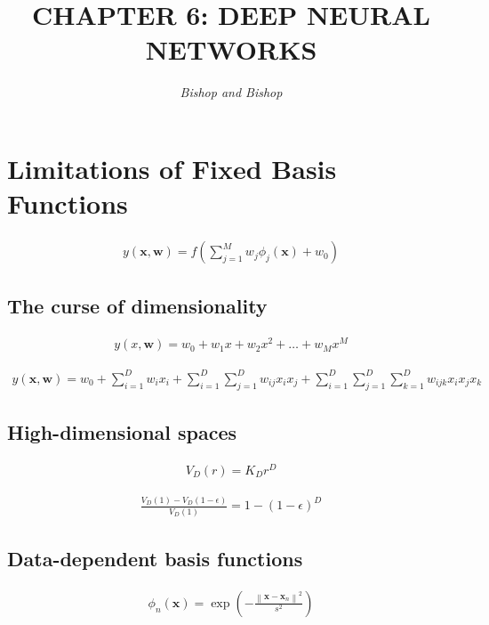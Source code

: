 \documentclass{article}
\title{\LARGE\scshape\MakeUppercase{Chapter 6: Deep Neural Networks}}
\author{\textit{Bishop and Bishop}}
\date{}  %
\begin{document}
\maketitle

\section{Limitations of Fixed Basis Functions}

\begin{align*}
y(\mathbf{x}, \mathbf{w})=f\left(\sum_{j=1}^{M} w_{j} \phi_{j}(\mathbf{x})+w_{0}\right) 
\tag{6.1}
\end{align*}

\subsection{The curse of dimensionality}

\begin{align*}
y(x, \mathbf{w})=w_{0}+w_{1} x+w_{2} x^{2}+\ldots+w_{M} x^{M} 
\tag{6.2}
\end{align*}

\begin{align*}
y(\mathbf{x}, \mathbf{w})=w_{0}+\sum_{i=1}^{D} w_{i} x_{i}+\sum_{i=1}^{D} \sum_{j=1}^{D} w_{i j} x_{i} x_{j}+\sum_{i=1}^{D} \sum_{j=1}^{D} \sum_{k=1}^{D} w_{i j k} x_{i} x_{j} x_{k} 
\tag{6.3}
\end{align*}

\subsection{High-dimensional spaces}

\begin{align*}
V_{D}(r)=K_{D} r^{D} 
\tag{6.4}
\end{align*}

\begin{align*}
\frac{V_{D}(1)-V_{D}(1-\epsilon)}{V_{D}(1)}=1-(1-\epsilon)^{D} 
\tag{6.5}
\end{align*}

\subsection{Data-dependent basis functions}

\begin{align*}
\phi_{n}(\mathbf{x})=\exp \left(-\frac{\left\|\mathbf{x}-\mathbf{x}_{n}\right\|^{2}}{s^{2}}\right) 
\tag{6.6}
\end{align*}
\end{document}

